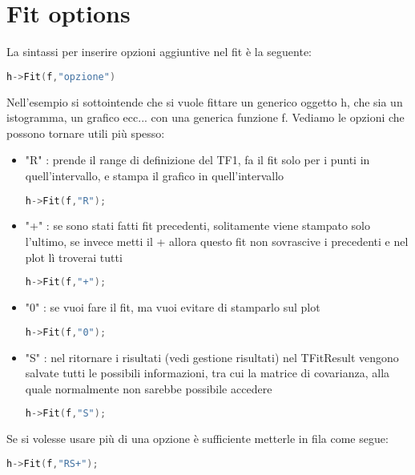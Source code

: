 \section{Fit options}
La sintassi per inserire opzioni aggiuntive nel fit è la seguente:
\begin{lstlisting}[language=C++,label={cod1},mathescape=true,breaklines=true]
	h->Fit(f,"opzione")
\end{lstlisting}
Nell'esempio si sottointende che si vuole fittare un generico oggetto h, che sia un istogramma, un grafico ecc... con una generica funzione f. Vediamo le opzioni che possono tornare utili più spesso:
\begin{itemize}
	\item "R" : prende il range di definizione del TF1, fa il fit solo per i punti in quell'intervallo, e stampa il grafico in quell'intervallo
\begin{lstlisting}[language=C++,label={cod1},mathescape=true,breaklines=true]
	h->Fit(f,"R");
\end{lstlisting}
	\item "+" : se sono stati fatti fit precedenti, solitamente viene stampato solo l'ultimo, se invece metti il + allora questo fit non sovrascive i precedenti e nel plot lì troverai tutti
\begin{lstlisting}[language=C++,label={cod1},mathescape=true,breaklines=true]
h->Fit(f,"+");
\end{lstlisting}
	\item "0" : se vuoi fare il fit, ma vuoi evitare di stamparlo sul plot
\begin{lstlisting}[language=C++,label={cod1},mathescape=true,breaklines=true]
	h->Fit(f,"0");
\end{lstlisting}
	\item "S" : nel ritornare i risultati (vedi gestione risultati) nel TFitResult vengono salvate tutti le possibili informazioni, tra cui la matrice di covarianza, alla quale normalmente non sarebbe possibile accedere
\begin{lstlisting}[language=C++,label={cod1},mathescape=true,breaklines=true]
	h->Fit(f,"S");
\end{lstlisting}
\end{itemize}
Se si volesse usare più di una opzione è sufficiente metterle in fila come segue:
\begin{lstlisting}[language=C++,label={cod1},mathescape=true,breaklines=true]
	h->Fit(f,"RS+");
\end{lstlisting}

